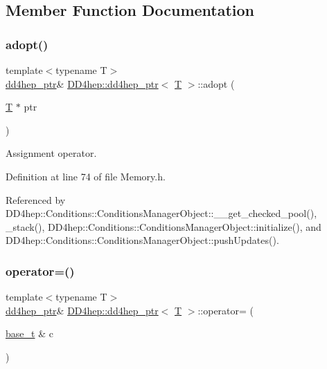 \subsection{Member Function Documentation}
\hypertarget{class_d_d4hep_1_1dd4hep__ptr_aa6519c1c4d2d455b6b5cfad3318d5cc9}{}\label{class_d_d4hep_1_1dd4hep__ptr_aa6519c1c4d2d455b6b5cfad3318d5cc9} 
\subsubsection{\texorpdfstring{adopt()}{adopt()}}
{\footnotesize\ttfamily template$<$typename T$>$ \\
\hyperlink{class_d_d4hep_1_1dd4hep__ptr}{dd4hep\+\_\+ptr}\& \hyperlink{class_d_d4hep_1_1dd4hep__ptr}{D\+D4hep\+::dd4hep\+\_\+ptr}$<$ \hyperlink{class_t}{T} $>$\+::adopt (\begin{DoxyParamCaption}\item[{\hyperlink{class_t}{T} $\ast$}]{ptr }\end{DoxyParamCaption})\hspace{0.3cm}{\ttfamily [inline]}}



Assignment operator. 



Definition at line 74 of file Memory.\+h.



Referenced by D\+D4hep\+::\+Conditions\+::\+Conditions\+Manager\+Object\+::\+\_\+\+\_\+get\+\_\+checked\+\_\+pool(), \+\_\+stack(), D\+D4hep\+::\+Conditions\+::\+Conditions\+Manager\+Object\+::initialize(), and D\+D4hep\+::\+Conditions\+::\+Conditions\+Manager\+Object\+::push\+Updates().

\hypertarget{class_d_d4hep_1_1dd4hep__ptr_a08249cfe600aa0ad78b8871db6df8b4f}{}\label{class_d_d4hep_1_1dd4hep__ptr_a08249cfe600aa0ad78b8871db6df8b4f} 
\subsubsection{\texorpdfstring{operator=()}{operator=()}}
{\footnotesize\ttfamily template$<$typename T$>$ \\
\hyperlink{class_d_d4hep_1_1dd4hep__ptr}{dd4hep\+\_\+ptr}\& \hyperlink{class_d_d4hep_1_1dd4hep__ptr}{D\+D4hep\+::dd4hep\+\_\+ptr}$<$ \hyperlink{class_t}{T} $>$\+::operator= (\begin{DoxyParamCaption}\item[{\hyperlink{class_d_d4hep_1_1dd4hep__ptr_a4bcbed2d2a920d0a5ffbf405263fe8d6}{base\+\_\+t} \&}]{c }\end{DoxyParamCaption})\hspace{0.3cm}{\ttfamily [inline]}}



